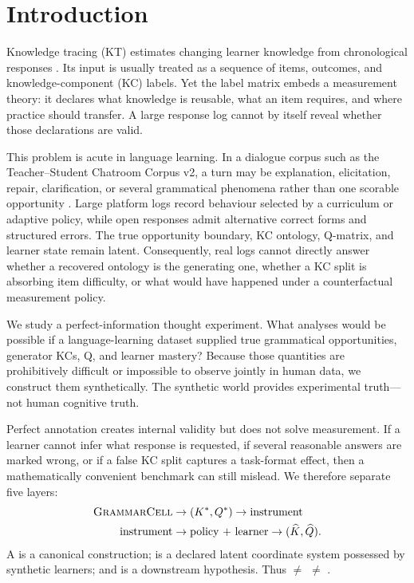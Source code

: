 \section{Introduction}

Knowledge tracing (KT) estimates changing learner knowledge from chronological
responses \citep{corbett-anderson-1995,abdelrahman-etal-2023}.  Its input is
usually treated as a sequence of items, outcomes, and knowledge-component (KC)
labels.  Yet the label matrix embeds a measurement theory: it declares what
knowledge is reusable, what an item requires, and where practice should
transfer.  A large response log cannot by itself reveal whether those
declarations are valid.

This problem is acute in language learning.  In a dialogue corpus such as the
Teacher--Student Chatroom Corpus v2, a turn may be explanation, elicitation,
repair, clarification, or several grammatical phenomena rather than one
scorable opportunity \citep{caines-etal-2022-teacher}.  Large platform logs
record behaviour selected by a curriculum or adaptive policy, while open
responses admit alternative correct forms and structured errors.  The true
opportunity boundary, KC ontology, Q-matrix, and learner state remain latent.
Consequently, real logs cannot directly answer whether a recovered ontology is
the generating one, whether a KC split is absorbing item difficulty, or what
would have happened under a counterfactual measurement policy.

We study a perfect-information thought experiment.  What analyses would be
possible if a language-learning dataset supplied true grammatical
opportunities, generator KCs, Q, and learner mastery?  Because those quantities
are prohibitively difficult or impossible to observe jointly in human data, we
construct them synthetically.  The synthetic world provides experimental
truth---not human cognitive truth.

Perfect annotation creates internal validity but does not solve measurement.
If a learner cannot infer what response is requested, if several reasonable
answers are marked wrong, or if a false KC split captures a task-format effect,
then a mathematically convenient benchmark can still mislead.  We therefore
separate five layers:
\begin{equation}
\begin{aligned}
\textsc{GrammarCell} &\rightarrow (K^{*},Q^{*})
\rightarrow \text{instrument} \\
\text{instrument} &\rightarrow \text{policy + learner}
\rightarrow (\widehat{K},\widehat{Q}) .
\end{aligned}
\end{equation}
A \grammarcell{} is a canonical construction; \kstar{} is a declared latent
coordinate system possessed by synthetic learners; and \khat{} is a downstream
hypothesis.  Thus \grammarcell{} $\ne$ \kstar{} $\ne$ \khat{}.

